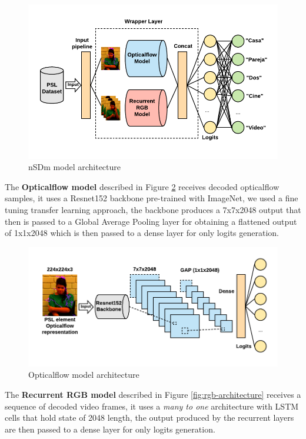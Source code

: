 \documentclass[twocolumn,conference]{article}
\begin{document}
\begin{figure}[hbt!]
\includegraphics[width=\linewidth]{images/nsdm-model-architecture.png}
\caption{nSDm model architecture}
\label{fig:ndsm-architecture}
\end{figure}

The \textbf{Opticalflow model} described in Figure \ref{fig:opticalflow-architecture} receives decoded opticalflow samples, it uses a Resnet152 backbone pre-trained with ImageNet, we used a fine tuning transfer learning approach, the backbone produces a 7x7x2048 output that then is passed to a Global Average Pooling layer for obtaining a flattened output of 1x1x2048 which is then passed to a dense layer for only logits generation.

\begin{figure}[hbt!]
\includegraphics[width=\linewidth]{images/opticalflow-model-architecture.png}
\caption{Opticalflow model architecture}
\label{fig:opticalflow-architecture}
\end{figure}

The \textbf{Recurrent RGB model} described in Figure \ref{fig:rgb-architecture} receives a sequence of decoded video frames, it uses a \textit{many to one} architecture with LSTM cells that hold state of 2048 length, the output produced by the recurrent layers are then passed to a dense layer for only logits generation.
\end{document}
